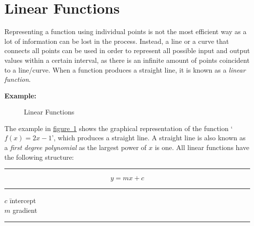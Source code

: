 \documentclass[a5paper,9pt]{book}
\theoremstyle{definition}
\newcommand{\nomlinesur}[2]{%
    \vspace*{\baselineskip}

    \hrule%

    \vspace*{\medskipamount}

    #1

    \vspace*{\medskipamount}

    \hrule%

    \vspace*{\medskipamount}
    
    #2

    \vspace*{\medskipamount}

    \hrule

    \vspace*{\baselineskip}
}
\newcommand{\fig}[2]{%
    \hyperref[#2]{#1~\ref*{#2}}%
}
\begin{document}

        \section{Linear Functions}\label{sec:linear_functions}

        Representing a function using individual points is not the most efficient way as a
        lot of information can be lost in the process. Instead, a line or a curve that
        connects all points can be used in order to represent all possible input and
        output values within a certain interval, as there is an infinite amount of points
        coincident to a line/curve. When a function produces a straight line, it is known
        as a \emph{linear function}.

        \pagebreak

        \noindent\textbf{Example:}
        
        \begin{figure}[ht]
            \centering
            
            \caption{Linear Functions}\label{fig:linear_functions}
        \end{figure}

        The example in \fig{figure}{fig:linear_functions} shows the graphical representation
        of the function `$f(x) = 2x-1$', which produces a straight line. A straight line
        is also known as a \emph{first degree polynomial} as the largest power of $x$
        is one. All linear functions have the following structure:

        \nomlinesur{%
            \begin{equation}
                y = mx + c
                \label{eq:straight_line_formula}
            \end{equation}
        }{%
            \vspace*{-0.5\baselineskip}

            \begin{tabbing}
                $c$ \hspace{25pt}\= intercept \\
                $m$ \> gradient
            \end{tabbing}

            \vspace*{-0.5\baselineskip}
        }
\end{document}
